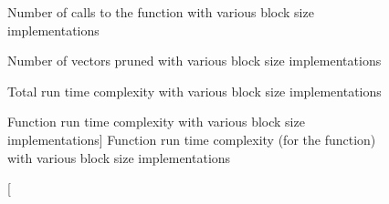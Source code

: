 \begin{figure}[H]
    \centering
    
    \caption{Number of calls to the  function with various
        block size implementations}
    \label{blockSizeProfiling:distanceCalls}
\end{figure}

\begin{figure}[H]
    \centering
    
    \caption{Number of vectors pruned with various block size implementations}
    \label{blockSizeProfiling:vectorsPruned}
\end{figure}

\begin{figure}[H]
    \centering
    
    \caption{Total run time complexity with various block size implementations}
    \label{blockSizeProfiling:totalRunTimeComplexity}
\end{figure}

\begin{figure}[H]
    \centering
    
    \caption
        [Function run time complexity with various block size implementations]
        {Function run time complexity (for the
             function) with various block
            size implementations}
    \label{blockSizeProfiling:functionRunTimeComplexity}
\end{figure}

